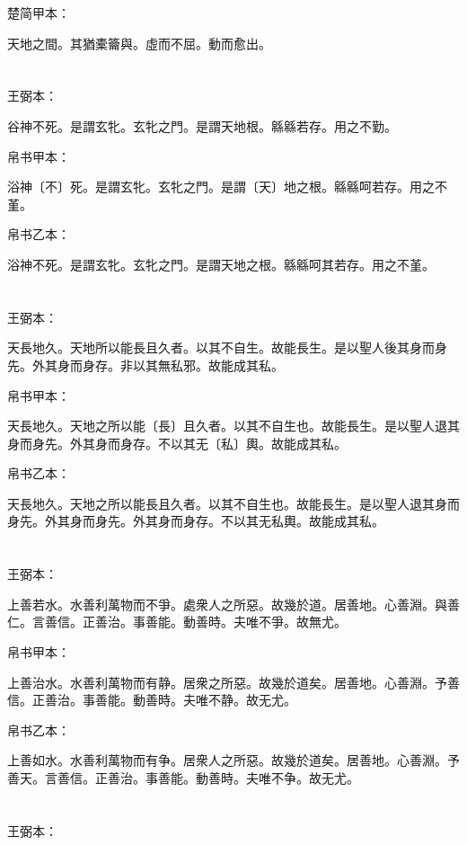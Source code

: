 \documentclass[a5paper]{ctexbook}
\begin{document}
    楚简甲本：

    天地之間。其猶橐籥與。虛而不屈。動而愈出。

    \chapter{}
    王弼本：

    谷神不死。是謂玄牝。玄牝之門。是謂天地根。緜緜若存。用之不勤。

    
    帛书甲本：

    浴神〔不〕死。是謂玄牝。玄牝之門。是謂〔天〕地之根。緜緜呵若存。用之不堇。

    帛书乙本：

    浴神不死。是謂玄牝。玄牝之門。是謂天地之根。緜緜呵其若存。用之不堇。

    \chapter{}
    王弼本：

    天長地久。天地所以能長且久者。以其不自生。故能長生。是以聖人後其身而身先。外其身而身存。非以其無私邪。故能成其私。

    
    帛书甲本：

    天長地久。天地之所以能〔長〕且久者。以其不自生也。故能長生。是以聖人退其身而身先。外其身而身存。不以其无〔私〕輿。故能成其私。

    帛书乙本：

    天長地久。天地之所以能長且久者。以其不自生也。故能長生。是以聖人退其身而身先。外其身而身先。外其身而身存。不以其无私輿。故能成其私。

    \chapter{}
    王弼本：

    上善若水。水善利萬物而不爭。處衆人之所惡。故幾於道。居善地。心善淵。與善仁。言善信。正善治。事善能。動善時。夫唯不爭。故無尤。

    
    帛书甲本：

    上善治水。水善利萬物而有静。居衆之所惡。故幾於道矣。居善地。心善淵。予善信。正善治。事善能。動善時。夫唯不静。故无尤。

    帛书乙本：

    上善如水。水善利萬物而有争。居衆人之所惡。故幾於道矣。居善地。心善淵。予善天。言善信。正善治。事善能。動善時。夫唯不争。故无尤。

    \chapter{}
    王弼本：
\end{document}
